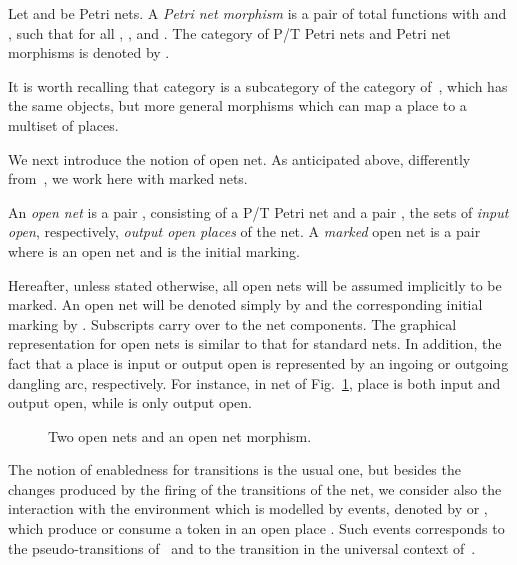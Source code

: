 \documentclass{LMCS}
\begin{document}
\begin{defi}
  Let  and  be Petri nets. A \emph{Petri net morphism}  is a pair of total functions  with  and , such that
  for all , ,
   and .
The category of P/T Petri nets and Petri net morphisms is denoted by
  .
\end{defi}
It is worth recalling that category  is a subcategory of the category
 of~\cite{MM:PNM}, which has the same objects, but
more general morphisms which can map a place to a multiset of
places.

We next introduce the notion of open net. As anticipated above,
differently from~\cite{BCEH:CMRS,BCEH:CSOP}, we work here with marked nets.


\begin{defi}
  \label{de:open-net}
  An \emph{open net} is a pair , consisting of a P/T Petri net 
 and a pair
,
  the sets of \emph{input open}, respectively, \emph{output open places}
  of the net.
A \emph{marked} open net is a pair  where  is an
  open net and  is the initial marking.
\end{defi}
Hereafter, unless stated otherwise, all open nets will be assumed
implicitly to be marked.  An open net will be denoted simply by  and
the corresponding initial marking by . Subscripts carry over to the
net components.
The graphical representation for open nets is similar to that for
standard nets. In addition, the fact that a place is input or
output open is represented by an ingoing or outgoing dangling arc, 
respectively. 
For instance, in net  of Fig.~\ref{fi:sample}, place
 is both input and output open, while  is only output open.

\begin{figure}[t]
  \begin{center}
  \end{center}

  \caption{Two open nets and an open net morphism.}
  \label{fi:sample}
\end{figure}







The notion of enabledness for transitions is the usual one, but
besides the changes produced by the firing of the transitions of the
net, we consider also the interaction with the environment which is
modelled by events, denoted by  or , which produce or
consume a token in an open place . 
Such events corresponds to the pseudo-transitions
of~\cite{v:modular-petri} and to the transition in the universal
context of~\cite{NPS:CBCP}.
\end{document}
